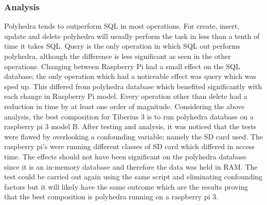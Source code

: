 \subsubsection{Analysis}
Polyhedra tends to outperform SQL in most operations. For create, insert, update and delete polyhedra will usually perform the task in less than a tenth of time it takes SQL. Query is the only operation in which SQL out performs polyhedra, although the difference is less significant as seen in the other operations.
\newline
Changing between Raspberry Pi had a small effect on the SQL database; the only operation which had a noticeable effect was query which was sped up. This differed from polyhedra database which benefited significantly with each change in Raspberry Pi model. Every operation other than delete had a reduction in time by at least one order of magnitude.
\newline
Considering the above analysis, the best composition for Tiberius 3 is to run polyhedra database on a raspberry pi 3 model B. 
\newline
After testing and analysis, it was noticed that the tests were flawed by overlooking a confounding variable; namely the SD card used. The raspberry pi's were running different classes of SD card which differed in access time. The effects should not have been significant on the polyhedra database since it is an in-memory database and therefore the data was held in RAM. The test could be carried out again using the same script and eliminating confounding factors but it will likely have the same outcome which are the results proving that the best composition is polyhedra running on a raspberry pi 3. 



















